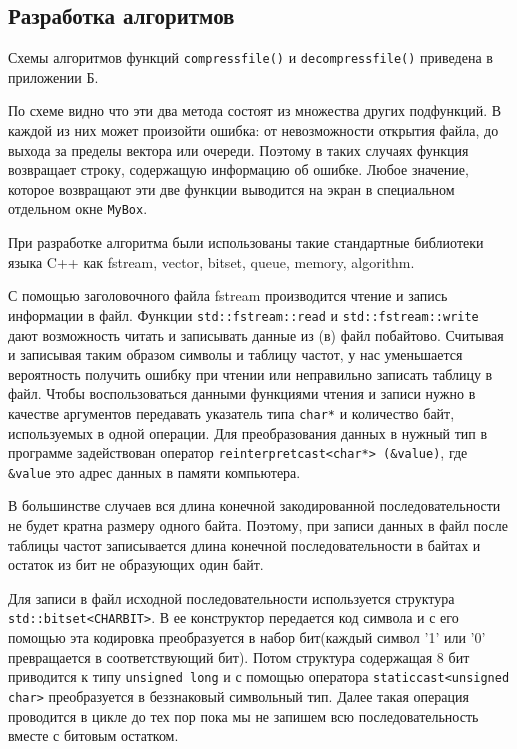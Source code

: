 \subsection{Разработка алгоритмов}


Схемы алгоритмов функций \texttt{compress{\textunderscore}file()} и \texttt{decompress{\textunderscore}file()} приведена в приложении Б.



По схеме видно что эти два метода состоят из множества других подфункций.
В каждой из них может произойти ошибка: от невозможности открытия файла, до выхода за пределы вектора или очереди.
Поэтому в таких случаях функция возвращает строку, содержащую информацию об ошибке.
Любое значение, которое возвращают эти две функции выводится на экран в специальном отдельном окне \texttt{MyBox}.



При разработке алгоритма были использованы такие стандартные библиотеки языка C++ как fstream, vector, bitset, queue, memory, algorithm.



С помощью заголовочного файла fstream производится чтение и запись информации в файл\cite{lafore}. 
Функции \texttt{std::fstream::read} и \texttt{std::fstream::write}\cite{cpp} дают возможность читать и записывать данные из (в) файл побайтово.
Считывая и записывая таким образом символы и таблицу частот, у нас уменьшается вероятность получить ошибку при чтении или неправильно записать таблицу в файл.
Чтобы воспользоваться данными функциями чтения и записи нужно в качестве аргументов передавать указатель типа \texttt{char*} и количество байт, используемых в одной операции.
Для преобразования данных в нужный тип в программе задействован оператор \texttt{reinterpret{\textunderscore}cast<char*> (\&value)}, где \texttt{\&value} это адрес данных в памяти компьютера.



В большинстве случаев вся длина конечной закодированной последовательности не будет кратна размеру одного байта.
Поэтому, при записи данных в файл после таблицы частот записывается длина конечной последовательности в байтах и остаток из бит не образующих один байт.



Для записи в файл исходной последовательности используется структура \texttt{std::bitset<CHAR{\textunderscore}BIT>}\cite{cpp}.
В ее конструктор передается код символа и с его помощью эта кодировка преобразуется в набор бит(каждый символ '1' или '0' превращается в соответствующий бит).
Потом структура содержащая 8 бит приводится к типу \texttt{unsigned long} и с помощью оператора \texttt{static{\textunderscore}cast<unsigned char>} преобразуется в беззнаковый символьный тип.
Далее такая операция проводится в цикле до тех пор пока мы не запишем всю последовательность вместе с битовым остатком.



